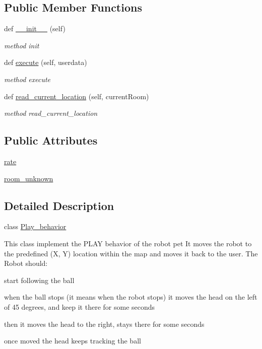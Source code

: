\subsection*{Public Member Functions}
\begin{DoxyCompactItemize}
\item 
def \hyperlink{classbehavior__manager_1_1Play__behavior_aaa6ce2b1855d0a235e324df41d8519a1}{\+\_\+\+\_\+init\+\_\+\+\_\+} (self)
\begin{DoxyCompactList}\small\item\em method init \end{DoxyCompactList}\item 
def \hyperlink{classbehavior__manager_1_1Play__behavior_a6c5231ed8f406c82e06c741e89b0f666}{execute} (self, userdata)
\begin{DoxyCompactList}\small\item\em method execute \end{DoxyCompactList}\item 
def \hyperlink{classbehavior__manager_1_1Play__behavior_a575ae46822b1544bd4d0670c2d99782e}{read\+\_\+current\+\_\+location} (self, current\+Room)
\begin{DoxyCompactList}\small\item\em method read\+\_\+current\+\_\+location \end{DoxyCompactList}\end{DoxyCompactItemize}
\subsection*{Public Attributes}
\begin{DoxyCompactItemize}
\item 
\hyperlink{classbehavior__manager_1_1Play__behavior_af636412228a2da30ad114266cbd121e3}{rate}
\item 
\hyperlink{classbehavior__manager_1_1Play__behavior_a8e31d349144e193480484d2a03dd3a7a}{room\+\_\+unknown}
\end{DoxyCompactItemize}


\subsection{Detailed Description}
class \hyperlink{classbehavior__manager_1_1Play__behavior}{Play\+\_\+behavior} 

This class implement the P\+L\+AY behavior of the robot pet It moves the robot to the predefined (X, Y) location within the map and moves it back to the user. The Robot should\+:
\begin{DoxyItemize}
\item start following the ball
\item when the ball stops (it means when the robot stops) it moves the head on the left of 45 degrees, and keep it there for some seconds
\item then it moves the head to the right, stays there for some seconds
\item once moved the head keeps tracking the ball 
\end{DoxyItemize}

